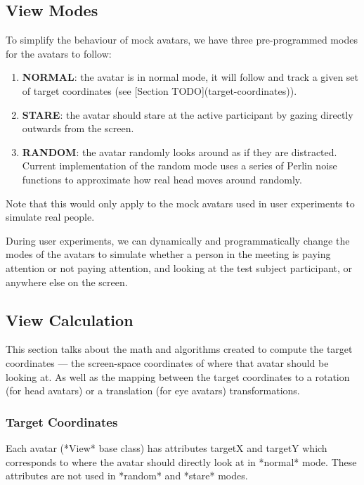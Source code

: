 \subsection{View Modes}

To simplify the behaviour of mock avatars, we have three pre-programmed modes for the avatars to follow:

\begin{enumerate}
    \item \textbf{NORMAL}: the avatar is in normal mode, it will follow and track a given set of target coordinates (see [Section TODO](target-coordinates)).
    \item \textbf{STARE}: the avatar should stare at the active participant by gazing directly outwards from the screen.
    \item \textbf{RANDOM}: the avatar randomly looks around as if they are distracted. Current implementation of the random mode uses a series of Perlin noise functions to approximate how real head moves around randomly.
\end{enumerate}

Note that this would only apply to the mock avatars used in user experiments to simulate real people.

During user experiments, we can dynamically and programmatically change the modes of the avatars to simulate whether a person in the meeting is paying attention or not paying attention, and looking at the test subject participant, or anywhere else on the screen.


\subsection{View Calculation}

This section talks about the math and algorithms created to compute the target coordinates --- the screen-space coordinates of where that avatar should be looking at. As well as the mapping between the target coordinates to a rotation (for head avatars) or a translation (for eye avatars) transformations.

\subsubsection{Target Coordinates}

Each avatar (*View* base class) has attributes targetX and targetY which corresponds to where the avatar should directly look at in *normal* mode. These attributes are not used in *random* and *stare* modes.

